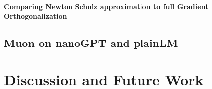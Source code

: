 \documentclass[12pt]{book}
\begin{document}
\subsubsection*{Comparing Newton Schulz approximation to full Gradient Orthogonalization}


\section{Muon on nanoGPT and plainLM} 

\chapter{Discussion and Future Work}


\end{document}
